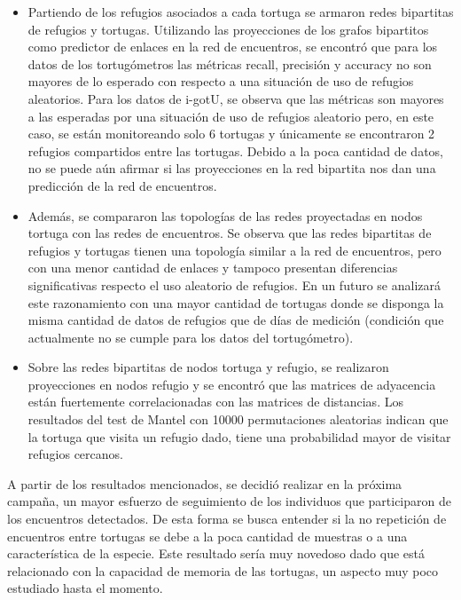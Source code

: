 \begin{itemize}
\item Partiendo de los refugios asociados a cada tortuga se armaron redes bipartitas de refugios y tortugas. Utilizando las proyecciones de los grafos bipartitos como predictor de enlaces en la red de encuentros, se encontró que para los datos de los tortugómetros las métricas recall, precisión y accuracy no son mayores de lo esperado con respecto a una situación de uso de refugios aleatorios. Para los datos de i-gotU, se observa que las métricas son mayores a las esperadas por  una situación de uso de refugios aleatorio pero, en este caso, se están monitoreando solo 6 tortugas y únicamente se encontraron 2 refugios compartidos entre las tortugas. Debido a la poca cantidad de datos, no se puede aún afirmar si las proyecciones en la red bipartita nos dan una predicción de la red de encuentros.
 
\item Además, se compararon las topologías de las redes proyectadas en nodos tortuga con las redes de encuentros. Se observa que las redes bipartitas de refugios y tortugas tienen una topología similar a la red de encuentros, pero con una menor cantidad de enlaces y tampoco presentan diferencias significativas respecto el uso aleatorio de refugios.  En un futuro se analizará este razonamiento con una mayor cantidad de tortugas donde se disponga la misma cantidad de datos de refugios que de días de medición (condición que actualmente no se cumple para los datos del tortugómetro).
 
\item Sobre las redes bipartitas de nodos tortuga y refugio, se realizaron proyecciones en nodos refugio y se encontró que las matrices de adyacencia están fuertemente correlacionadas con las matrices de distancias. Los resultados del test de Mantel con 10000 permutaciones aleatorias indican que la tortuga que visita un refugio dado, tiene una probabilidad mayor de visitar refugios cercanos.
 
 
 
\end{itemize}
 
 
 
A partir de los resultados mencionados, se decidió realizar en la próxima campaña, un mayor esfuerzo de seguimiento de los individuos que participaron de los encuentros  detectados. De esta forma se busca entender si la no repetición de encuentros entre tortugas se debe a la poca cantidad de muestras o a una característica de la especie. Este resultado sería muy novedoso dado que está relacionado con la capacidad de memoria de las tortugas, un aspecto muy poco estudiado hasta el momento.
 
